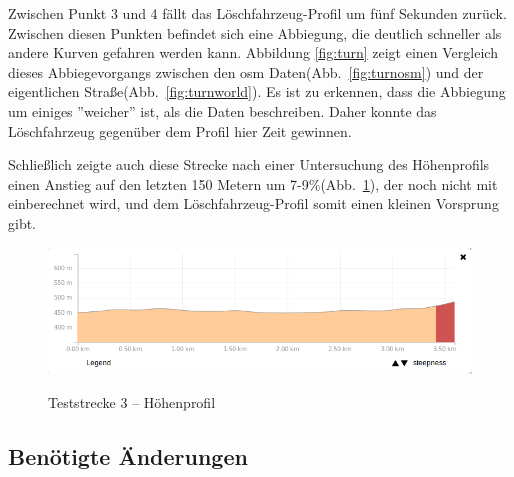 Zwischen Punkt 3 und 4 fällt das Löschfahrzeug-Profil um fünf Sekunden zurück.
Zwischen diesen Punkten befindet sich eine Abbiegung, die deutlich schneller als andere Kurven gefahren werden kann.
Abbildung \ref{fig:turn} zeigt einen Vergleich dieses Abbiegevorgangs zwischen den \gls{osm} Daten(Abb.~\ref{fig:turnosm}) und der eigentlichen Straße(Abb.~\ref{fig:turnworld}).
Es ist zu erkennen, dass die Abbiegung um einiges ''weicher'' ist, als die Daten beschreiben.
Daher konnte das Löschfahrzeug gegenüber dem Profil hier Zeit gewinnen.

Schließlich zeigte auch diese Strecke nach einer Untersuchung des Höhenprofils einen Anstieg auf den letzten 150 Metern um 7-9$\%$(Abb.~\ref{fig:profile2}), der noch nicht mit einberechnet wird, und dem Löschfahrzeug-Profil somit einen kleinen Vorsprung gibt.

\begin{figure}[htb]
\centering
\caption{Teststrecke 3 -- Höhenprofil}
\label{fig:profile2}
\includegraphics[width = 0.90 \textwidth]{../media/Fahrt3_Profile.png} \\
\end{figure}


\subsection{Benötigte Änderungen}

